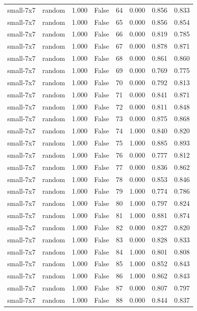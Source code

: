 \begin{tabular}{llrrrrrr}
small-7x7 & random & 1.000 & False & 64 & 0.000 & 0.856 & 0.833 \\
small-7x7 & random & 1.000 & False & 65 & 0.000 & 0.856 & 0.854 \\
small-7x7 & random & 1.000 & False & 66 & 0.000 & 0.819 & 0.785 \\
small-7x7 & random & 1.000 & False & 67 & 0.000 & 0.878 & 0.871 \\
small-7x7 & random & 1.000 & False & 68 & 0.000 & 0.861 & 0.860 \\
small-7x7 & random & 1.000 & False & 69 & 0.000 & 0.769 & 0.775 \\
small-7x7 & random & 1.000 & False & 70 & 0.000 & 0.792 & 0.813 \\
small-7x7 & random & 1.000 & False & 71 & 0.000 & 0.841 & 0.871 \\
small-7x7 & random & 1.000 & False & 72 & 0.000 & 0.811 & 0.848 \\
small-7x7 & random & 1.000 & False & 73 & 0.000 & 0.875 & 0.868 \\
small-7x7 & random & 1.000 & False & 74 & 1.000 & 0.840 & 0.820 \\
small-7x7 & random & 1.000 & False & 75 & 1.000 & 0.885 & 0.893 \\
small-7x7 & random & 1.000 & False & 76 & 0.000 & 0.777 & 0.812 \\
small-7x7 & random & 1.000 & False & 77 & 0.000 & 0.836 & 0.862 \\
small-7x7 & random & 1.000 & False & 78 & 0.000 & 0.853 & 0.846 \\
small-7x7 & random & 1.000 & False & 79 & 1.000 & 0.774 & 0.786 \\
small-7x7 & random & 1.000 & False & 80 & 1.000 & 0.797 & 0.824 \\
small-7x7 & random & 1.000 & False & 81 & 1.000 & 0.881 & 0.874 \\
small-7x7 & random & 1.000 & False & 82 & 0.000 & 0.827 & 0.820 \\
small-7x7 & random & 1.000 & False & 83 & 0.000 & 0.828 & 0.833 \\
small-7x7 & random & 1.000 & False & 84 & 1.000 & 0.801 & 0.808 \\
small-7x7 & random & 1.000 & False & 85 & 1.000 & 0.852 & 0.843 \\
small-7x7 & random & 1.000 & False & 86 & 1.000 & 0.862 & 0.843 \\
small-7x7 & random & 1.000 & False & 87 & 0.000 & 0.807 & 0.797 \\
small-7x7 & random & 1.000 & False & 88 & 0.000 & 0.844 & 0.837 \\

\end{tabular}
